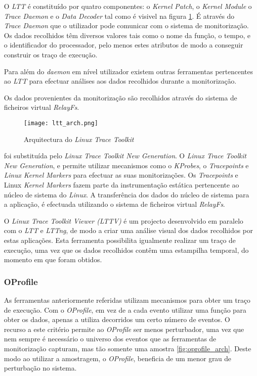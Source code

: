 O \textit{LTT} é constituído por quatro componentes: o \textit{Kernel Patch}, o \textit{Kernel Module} o \textit{Trace Daemon} e o \textit{Data Decoder} tal como é visivel na figura \ref{fig:ltt_arch}.
É através do \textit{Trace Daemon} que o utilizador pode comunicar com o sistema de monitorização.
Os dados recolhidos têm diversos valores tais como o nome da função, o tempo, e o identificador do processador, pelo menos estes atributos de modo a conseguir construir os traço de execução.


Para além do \textit{daemon} em nível utilizador existem outras ferramentas pertencentes ao \textit{LTT} para efectuar análises aos dados recolhidos durante a monitorização.


Os dados provenientes da monitorização são recolhidos através do sistema de ficheiros virtual \textit{RelayFs}.

\begin{figure}[!htb]
       \centering
       \texttt{[image: ltt\_arch.png]}
       \caption{Arquitectura do \textit{Linux Trace Toolkit} \cite{Yaghmour:2000:MCS:1267724.1267726}}
	\label{fig:ltt_arch}
\end{figure}

\cite{Yaghmour:2000:MCS:1267724.1267726}
foi substituída pelo \textit{Linux Trace Toolkit New Generation}.
O \textit{Linux Trace Toolkit New Generation}, e permite utilizar mecanismos como o \textit{KProbes}, o \textit{Tracepoints}\cite{Mathieu2009} e \textit{Linux Kernel Markers}\cite{Mathieu2009} para efectuar as suas monitorizações.
Os \textit{Tracepoints} e Linux \textit{Kernel Markers} fazem parte da instrumentação estática pertencente ao núcleo de sistema do \textit{Linux}.
A transferência dos dados do núcleo de sistema para a aplicação, é efectuada utilizando o sistema de ficheiros virtual \textit{RelayFs}.

O \textit{Linux Trace Toolkit Viewer (LTTV)} é um projecto desenvolvido em paralelo com o \textit{LTT} e \textit{LTTng}, de modo a criar uma análise visual dos dados recolhidos por estas aplicações.
Esta ferramenta possibilita igualmente realizar um traço de execução, uma vez que os dados recolhidos contêm uma estampilha temporal, do momento em que foram obtidos.
 
\subsubsection{OProfile}\label{cap:Oprofile_overview}
As ferramentas anteriormente referidas utilizam mecanismos para obter um traço de execução.
Com o \textit{OProfile}, em vez de a cada evento utilizar uma função para obter os dados, apenas a utiliza decorridos um certo número de eventos.
O recurso a este critério permite ao \textit{OProfile} ser menos perturbador, uma vez que nem sempre é necessário o universo dos eventos que as ferramentas de monitorização capturam, mas tão somente uma amostra \ref{fig:oprofile_arch}.
Deste modo ao utilizar a amostragem, o \textit{OProfile}, beneficia de um menor grau de perturbação no sistema\cite{Will:TuninProgrOProf}.

